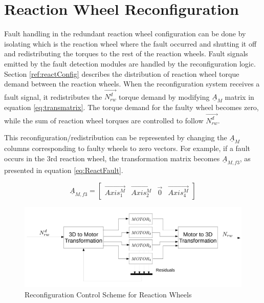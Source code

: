\section{Reaction Wheel Reconfiguration}
\label{sec:rwReconfig}
Fault handling in the redundant reaction wheel configuration can be done by isolating which is the reaction wheel where the fault occurred and shutting it off and redistributing the torques to the rest of the reaction wheels. Fault signals emitted by the fault detection modules are handled by the reconfiguration logic. Section \ref{ref:reactConfig} describes the distribution of reaction wheel torque demand between the reaction wheels. When the reconfiguration system receives a fault signal, it redistributes the $\vec{N_{rw}^d}$ torque demand by modifying $\underline{A}_M$ matrix in equation \ref{eq:transmatrix}. The torque demand for the faulty wheel becomes zero, while the sum of reaction wheel torques are controlled to follow $\vec{N_{rw}^d}$.

This reconfiguration/redistribution can be represented by changing the $\underline{A}_M$ columns corresponding to faulty wheels to zero vectors. For example, if a fault occurs in the 3rd reaction wheel, the transformation matrix becomes $\underline{A}_{M,f3}$, as presented in equation \ref{eq:ReactFault}.

\begin{equation}
	\label{eq:ReactFault}
	\underline{A}_{M,f3} = \begin{bmatrix}
		\vec{Axis^{M}_{1}}       & \vec{Axis^{M}_{2}}   & \vec{0}   & \vec{Axis^{M}_{4}} 
	\end{bmatrix} 
\end{equation}

\begin{figure}[H]
	\centering 
	\includegraphics[width=170mm]{figures/reconfig.pdf}	
	\caption{Reconfiguration Control Scheme for Reaction Wheels}
	\label{fig:reconfig}
\end{figure}


